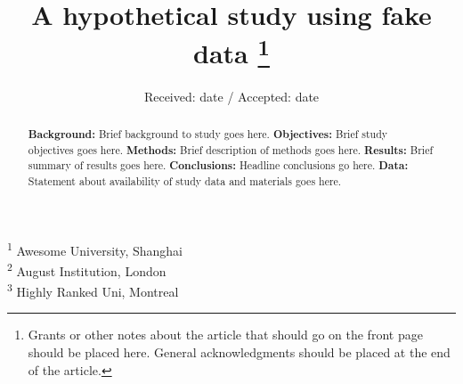 \documentclass[smallextended]{svjour3}       %
\begin{document}
\title{A hypothetical study using fake data \thanks{Grants or other notes about the article that should go on the front
page should be placed here. General acknowledgments should be placed at the
end of the article.} }



\author{  }


\institute{
    }

\date{Received: date / Accepted: date}


\maketitle

\begin{abstract}
\textbf{Background: } Brief background to study goes here. \newline \newline \textbf{Objectives: } Brief study objectives goes here. \newline \newline \textbf{Methods: } Brief description of methods goes here. \newline \newline \textbf{Results: } Brief summary of results goes here. \newline \newline \textbf{Conclusions: } Headline conclusions go here. \newline \newline \textbf{Data: } Statement about availability of study data and materials goes here. \newline \newline
\\


\end{abstract}


\def\spacingset#1{\renewcommand{\baselinestretch}%
{#1}\small\normalsize} \spacingset{1}


\textsuperscript{1} Awesome University, Shanghai\\
\textsuperscript{2} August Institution, London\\
\textsuperscript{3} Highly Ranked Uni, Montreal
\end{document}
